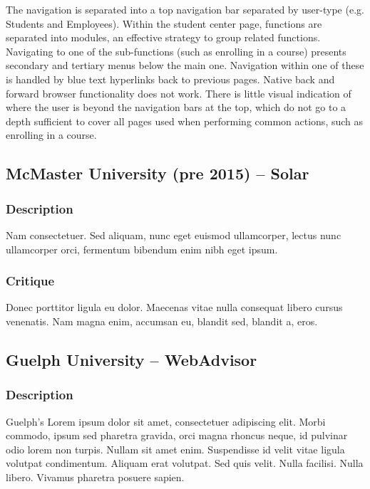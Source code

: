 \documentclass[10pt]{article}
\begin{document}
\begin{multicols}{2}
The navigation is separated into a top navigation bar separated by user-type (e.g. Students and Employees). Within the student center page, functions are separated into modules, an effective strategy to group related functions. Navigating to one of the sub-functions (such as enrolling in a course) presents secondary and tertiary menus below the main one. Navigation within one of these is handled by blue text hyperlinks back to previous pages. Native back and forward browser functionality does not work. There is little visual indication of where the user is beyond the navigation bars at the top, which do not go to a depth sufficient to cover all pages used when performing common actions, such as enrolling in a course.

\subsection*{McMaster University (pre 2015) -- Solar}
\subsubsection*{Description}
Nam consectetuer. Sed aliquam, nunc eget euismod ullamcorper, lectus nunc ullamcorper orci, fermentum bibendum enim nibh eget ipsum.

\subsubsection*{Critique}
Donec porttitor ligula eu dolor. Maecenas vitae nulla consequat libero cursus venenatis. Nam magna enim, accumsan eu, blandit sed, blandit a, eros.

\subsection*{Guelph University -- WebAdvisor}
\subsubsection*{Description}
Guelph's Lorem ipsum dolor sit amet, consectetuer adipiscing elit. Morbi commodo, ipsum sed pharetra gravida, orci magna rhoncus neque, id pulvinar odio lorem non turpis. Nullam sit amet enim. Suspendisse id velit vitae ligula volutpat condimentum. Aliquam erat volutpat. Sed quis velit. Nulla facilisi. Nulla libero. Vivamus pharetra posuere sapien.\\


\end{multicols}
\end{document}
